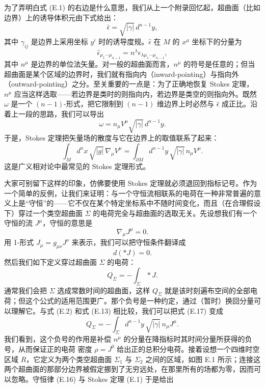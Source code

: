 为了弄明白式 (E.1) 的右边是什么意思，我们从上一个附录回忆起，超曲面（比如边界）上的诱导体积元由下式给出：
\begin{equation*}
\widehat{\epsilon} = \sqrt{|\gamma|}\,d^{n-1}y,
\tag{E.11}
\end{equation*}
其中 $\gamma_{ij}$ 是边界上采用坐标 $y^i$ 时的诱导度规。$\widehat{\epsilon}$ 在 $M$ 的 $x^\mu$ 坐标下的分量为
\begin{equation*}
\widehat{\epsilon}_{\mu_1\cdots\mu_{n-1}} = n^\lambda\epsilon_{\lambda\mu_1\cdots\mu_{n-1}},
\tag{E.12}
\end{equation*}
其中 $n^\mu$ 是边界的单位法矢量。对一般的超曲面而言，$n^\mu$ 的符号是任意的；但当超曲面是某个区域的边界时，我们就有指向内（inward-pointing）与指向外（outward-pointing）之分。至关重要的一点是：为了正确地恢复 Stokes 定理，$n^\mu$ 应当这样选取——若边界是类时的则指向内，若边界是类空的则指向外。既然 $\omega$ 是一个 $(n-1)$-形式，把它限制到 $(n-1)$ 维边界上时必然与 $\widehat{\epsilon}$ 成正比。沿着上一段的思路，我们可以导出
\begin{equation*}
\omega = n_\mu V^\mu\sqrt{|\gamma|}\,d^{n-1}y.
\tag{E.13}
\end{equation*}
于是，Stokes 定理把矢量场的散度与它在边界上的取值联系了起来：
\begin{equation*}
\boxed{\int_M d^nx\,\sqrt{|g|}\,\nabla_\mu V^\mu = \int_{\partial M} d^{n-1}y\,\sqrt{|\gamma|}\,n_\mu V^\mu.}
\tag{E.14}
\end{equation*}
这是广义相对论中最常见的 Stokes 定理形式。

大家可别留下这样的印象，仿佛要使用 Stokes 定理就必须退回到指标记号。作为一个简单的反例，让我们来证明：与一个守恒流相联系的电荷在一种非常普遍的意义上是“守恒”的——它不仅在某个特定坐标系中不随时间变化，而且（在合理假设下）穿过一个类空超曲面 $\Sigma$ 的电荷完全与超曲面的选取无关。先设想我们有一个守恒的流 $J^\mu$，守恒的意思是
\begin{equation*}
\nabla_\mu J^\mu = 0.
\tag{E.15}
\end{equation*}
用 1-形式 $J_\mu = g_{\mu\nu}J^\nu$ 来表示，我们可以把守恒条件翻译成
\begin{equation*}
d(*J) = 0.
\tag{E.16}
\end{equation*}
然后我们如下定义穿过超曲面 $\Sigma$ 的电荷：
\begin{equation*}
Q_\Sigma = -\int_\Sigma *J.
\tag{E.17}
\end{equation*}
通常我们会把 $\Sigma$ 选成常数时间的超曲面，这样 $Q_\Sigma$ 就是该时刻遍布空间的全部电荷；但这个公式的适用范围更广。那个负号是一种约定，通过（暂时）换回分量可以理解它。与式 (E.2) 和式 (E.13) 相比较，我们可以把式 (E.17) 变成
\begin{equation*}
Q_\Sigma = -\int_\Sigma d^{n-1}y\,\sqrt{|\gamma|}\,n_\mu J^\mu.
\tag{E.18}
\end{equation*}
我们看到，这个负号的作用是补偿 $n^\mu$ 的分量在降指标时其时间分量所获得的负号，从而保证正的电荷%
密度 $\rho = J^0$ 给出正的总积分电荷。接着设想一个四维时空区域 $R$，它定义为两个类空超曲面 $\Sigma_1$ 与 $\Sigma_2$ 之间的区域，如图 E.1 所示；连接这两个超曲面的那部分边界被假定挪到了无穷远处，在那里所有的场都为零，因而可以忽略。守恒律 (E.16) 与 Stokes 定理 (E.1) 于是给出

